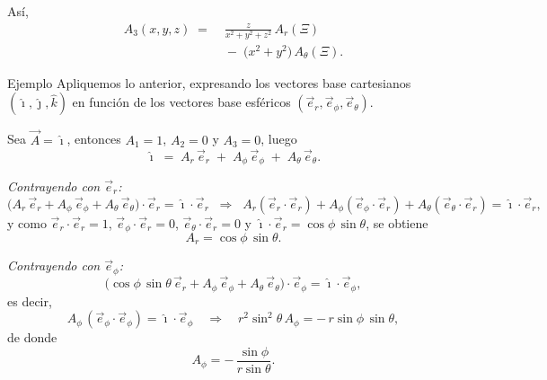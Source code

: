 \documentclass[../apunte_mecanica_clasica.tex]{subfiles}%
\begin{document}
\begin{itemize}
Así,
\begin{equation*}
\begin{aligned}
A_3(x,y,z) \;=&\; \frac{z}{x^2+y^2+z^2}\,A_r(\Xi)\\[4pt]
&\;-\; \big(x^2+y^2\big)\,A_\theta(\Xi).
\end{aligned}
\end{equation*}

\end{itemize}

\begin{apuntebloque}{Ejemplo}
Apliquemos lo anterior, expresando los vectores base cartesianos $(\hat{\imath}, \hat{\jmath}, \hat{k})$ en función de los vectores base esféricos $(\vec{e}_r, \vec{e}_\phi, \vec{e}_\theta)$.

Sea $\vec{A}=\hat{\imath}$, entonces $A_1=1$, $A_2=0$ y $A_3=0$, luego
\begin{equation*}
\hat{\imath} \;=\; A_r\,\vec{e}_r \;+\; A_\phi\,\vec{e}_\phi \;+\; A_\theta\,\vec{e}_\theta.
\end{equation*}

\emph{Contrayendo con $\vec{e}_r$:}
\begin{equation*}
\big(A_r\,\vec{e}_r + A_\phi\,\vec{e}_\phi + A_\theta\,\vec{e}_\theta\big)\!\cdot\!\vec{e}_r
= \hat{\imath}\!\cdot\!\vec{e}_r
\;\;\Rightarrow\;\;
A_r(\vec{e}_r\!\cdot\!\vec{e}_r)+A_\phi(\vec{e}_\phi\!\cdot\!\vec{e}_r)+A_\theta(\vec{e}_\theta\!\cdot\!\vec{e}_r)
= \hat{\imath}\!\cdot\!\vec{e}_r,
\end{equation*}
y como $\vec{e}_r\!\cdot\!\vec{e}_r=1$, $\vec{e}_\phi\!\cdot\!\vec{e}_r=0$, $\vec{e}_\theta\!\cdot\!\vec{e}_r=0$ y $\hat{\imath}\!\cdot\!\vec{e}_r=\cos\phi\,\sin\theta$, se obtiene
\begin{equation*}
A_r=\cos\phi\,\sin\theta.
\end{equation*}

\emph{Contrayendo con $\vec{e}_\phi$:}
\begin{equation*}
\big(\cos\phi\,\sin\theta\,\vec{e}_r + A_\phi\,\vec{e}_\phi + A_\theta\,\vec{e}_\theta\big)\!\cdot\!\vec{e}_\phi
= \hat{\imath}\!\cdot\!\vec{e}_\phi,
\end{equation*}
es decir,
\begin{equation*}
A_\phi\,(\vec{e}_\phi\!\cdot\!\vec{e}_\phi) = \hat{\imath}\!\cdot\!\vec{e}_\phi
\quad\Rightarrow\quad
r^2\sin^2\theta\,A_\phi = -\,r\sin\phi\,\sin\theta,
\end{equation*}
de donde
\begin{equation*}
A_\phi = -\,\frac{\sin\phi}{r\sin\theta}.
\end{equation*}


\end{apuntebloque}
\end{document}
